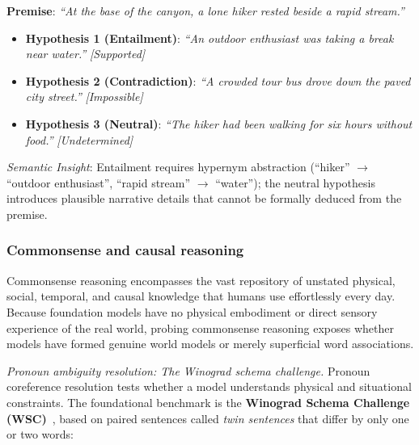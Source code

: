 \documentclass[../../../main.tex]{subfiles}
\begin{document}
\begin{center}
\begin{minipage}{0.95\textwidth}
\begin{tcolorbox}[colback=cardBg,colframe=cardLine,arc=2pt,boxrule=0.5pt,title=\textbf{Task Example: Natural Language Inference (MultiNLI)}]
\small\sffamily
\textbf{Premise}: \textit{``At the base of the canyon, a lone hiker rested beside a rapid stream.''}
\begin{itemize}[leftmargin=1.5em,itemsep=2pt]
    \item \textbf{Hypothesis 1 (Entailment)}: \textit{``An outdoor enthusiast was taking a break near water.''} \hfill \textit{[Supported]}
    \item \textbf{Hypothesis 2 (Contradiction)}: \textit{``A crowded tour bus drove down the paved city street.''} \hfill \textit{[Impossible]}
    \item \textbf{Hypothesis 3 (Neutral)}: \textit{``The hiker had been walking for six hours without food.''} \hfill \textit{[Undetermined]}
\end{itemize}
\textit{Semantic Insight}: Entailment requires hypernym abstraction (``hiker'' $\to$ ``outdoor enthusiast'', ``rapid stream'' $\to$ ``water''); the neutral hypothesis introduces plausible narrative details that cannot be formally deduced from the premise.
\end{tcolorbox}
\end{minipage}
\end{center}

\subsubsection{Commonsense and causal reasoning}
\label{subsec:commonsense_causal_reasoning}
Commonsense reasoning encompasses the vast repository of unstated physical, social, temporal, and causal knowledge that humans use effortlessly every day. Because foundation models have no physical embodiment or direct sensory experience of the real world, probing commonsense reasoning exposes whether models have formed genuine world models or merely superficial word associations.

\textit{Pronoun ambiguity resolution: The Winograd schema challenge.}
Pronoun coreference resolution tests whether a model understands physical and situational constraints. The foundational benchmark is the \textbf{Winograd Schema Challenge (WSC)}~\cite{levesque2012winograd}, based on paired sentences called \textit{twin sentences} that differ by only one or two words:
\end{document}
